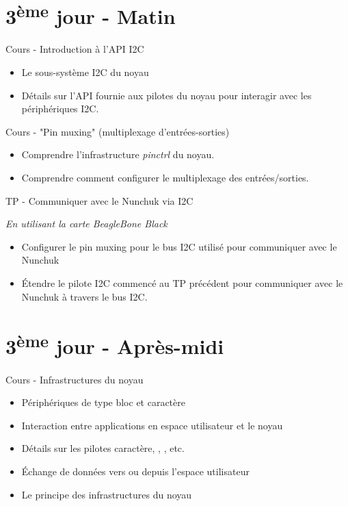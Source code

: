 \documentclass[a4paper,12pt,obeyspaces,spaces,hyphens]{article}
\begin{document}
\section{3\textsuperscript{ème} jour - Matin}

\feagendatwocolumn
{Cours - Introduction à l'API I2C}
{
  \begin{itemize}
  \item Le sous-système I2C du noyau
  \item Détails sur l'API fournie aux pilotes du noyau pour interagir
    avec les périphériques I2C.
  \end{itemize}
}
{Cours - "Pin muxing" (multiplexage d'entrées-sorties)}
{
  \begin{itemize}
  \item Comprendre l'infrastructure {\em pinctrl} du noyau.
  \item Comprendre comment configurer le multiplexage des
    entrées/sorties.
  \end{itemize}
}

\feagendaonecolumn
{TP - Communiquer avec le Nunchuk via I2C}
{
  {\em En utilisant la carte BeagleBone Black}
  \begin{itemize}
  \item Configurer le pin muxing pour le bus I2C utilisé pour
    communiquer avec le Nunchuk
  \item Étendre le pilote I2C commencé au TP précédent pour
    communiquer avec le Nunchuk à travers le bus I2C.
  \end{itemize}
}

\section{3\textsuperscript{ème} jour - Après-midi}

\feagendaonecolumn
{Cours - Infrastructures du noyau}
{
  \begin{itemize}
  \item Périphériques de type bloc et caractère
  \item Interaction entre applications en espace utilisateur et le noyau
  \item Détails sur les pilotes caractère,  ,
    , etc.
  \item Échange de données vers ou depuis l'espace utilisateur
  \item Le principe des infrastructures du noyau
  \end{itemize}
}
\end{document}
